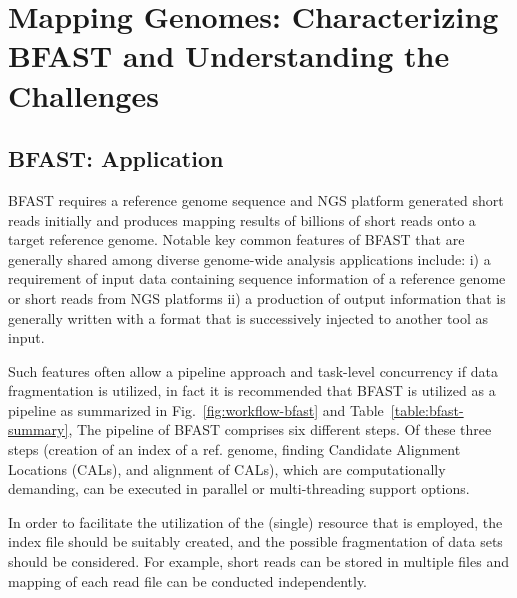 \documentclass{sig-alternate}
\begin{document}
\section{Mapping Genomes: Characterizing BFAST and Understanding
  the Challenges}

\subsection{BFAST: Application}


BFAST requires a reference genome sequence and NGS
platform generated short reads initially and produces mapping results
of billions of short reads onto a target reference genome.  Notable
key common features of BFAST that are generally shared among diverse genome-wide analysis applications include: i) a requirement of input data containing
sequence information of a reference genome or short reads from NGS
platforms ii) a production of output information that is generally
written with a format that is successively injected to another tool as
input.




Such features often allow a pipeline approach and task-level
concurrency if data fragmentation is utilized, in fact it is
recommended that BFAST is utilized as a pipeline as summarized in
Fig.~\ref{fig:workflow-bfast} and Table~\ref{table:bfast-summary}, The
pipeline of BFAST comprises six different steps. Of these three steps
(creation of an index of a ref. genome, finding Candidate Alignment
Locations (CALs), and alignment of CALs), which are computationally
demanding, can be executed in parallel or multi-threading support
options.
 
In order to facilitate the utilization of the (single) resource that
is employed, the index file should be suitably created, and the
possible fragmentation of data sets should be considered.  For
example, short reads can be stored in multiple files and mapping of
each read file can be conducted independently.
 
\end{document}

